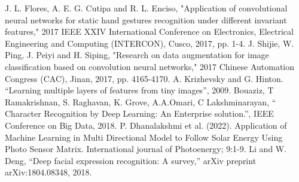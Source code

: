 \documentclass[conference]{IEEEtran}
\begin{document}
\begin{thebibliography}{00}
 J. L. Flores, A. E. G. Cutipa and R. L. Enciso, "Application of 
convolutional neural networks for static hand gestures recognition 
under different invariant features," 2017 IEEE XXIV International 
Conference on Electronics, Electrical Engineering and Computing 
(INTERCON), Cusco, 2017, pp. 1-4. 
 J. Shijie, W. Ping, J. Peiyi and H. Siping, "Research on data augmentation for image classification based on convolution neural networks," 2017 Chinese Automation Congress (CAC), Jinan, 2017, pp. 4165-4170. 
 A. Krizhevsky and G. Hinton. “Learning multiple layers of features from tiny images”, 2009. 
 Bouaziz, T Ramakrishnan, S. Raghavan, K. Grove, A.A.Omari, C 
Lakshminarayan, “ Character Recognition by Deep Learning: An 
Enterprise solution.”, IEEE Conference on Big Data, 2018. 
 P. Dhanalakshmi et al. (2022). Application of Machine Learning in Multi
Directional Model to Follow Solar Energy Using Photo Sensor 
Matrix. International journal of Photoenergy; 9:1-9.
 Li and W. Deng, “Deep facial expression recognition: A survey,” arXiv preprint arXiv:1804.08348, 2018.  
\end{thebibliography}
\end{document}
